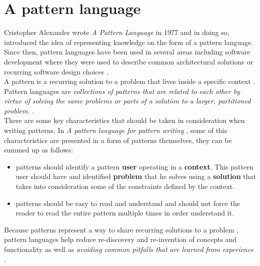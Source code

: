     \section{A pattern language} \label{sec:stateoftheart:sec:patterns}
    Cristopher Alexander wrote \textit{A Pattern Language}\cite{alexander1977pattern} in 1977 and in doing so, introduced the idea of representing knowledge on the form of a pattern language. Since then, pattern languages have been used in several areas \cite{Meszaros1998} including software development where they were used to describe common architectural solutions \cite{kircher2013pattern} or recurring software design choices \cite{johnson1995design}.  \\
    A pattern is a recurring solution to a problem that lives inside a specific context \cite{Meszaros1998}. Pattern languages are \textit{collections of patterns that are related to each other by virtue of solving the same problems or parts of a solution to a larger, partitioned problem.} \cite{Meszaros1998}.\\
    There are some key characteristics that should be taken in consideration when writing patterns. In \textit{A pattern language for pattern writing} \cite{Meszaros1998}, some of this characteristics are presented in a form of patterns themselves, they can be summed up as follows:
    \begin{itemize}
      \item patterns should identify a pattern \textbf{user} operating in a \textbf{context}. This pattern user should have and identified \textbf{problem} that he solves using a \textbf{solution} that takes into consideration some of the constraints defined by the context.
      \item patterns should be easy to read and understand and should not force the reader to read the entire pattern multiple times in order understand it.
    \end{itemize}
    Because patterns represent a way to share recurring solutions to a problem \cite{Meszaros1998}, pattern languages help reduce re-discovery and re-invention of concepts and functionality as well as \textit{avoiding common pitfalls that are learned from experience} \cite{Schmidt1995}.
